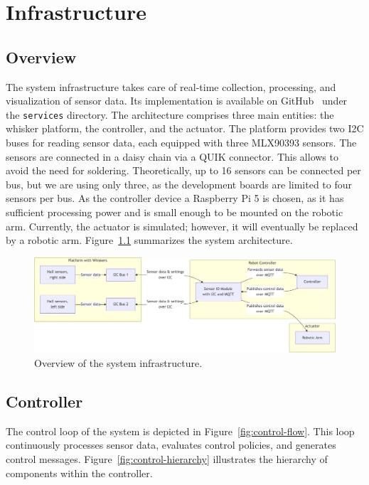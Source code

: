 

\chapter{Infrastructure}


\section{Overview}
The system infrastructure takes care of real-time collection, processing, and visualization of sensor data.
Its implementation is available on GitHub~\cite{ratte-github} under the \texttt{services} directory.
The architecture comprises three main entities: the whisker platform, the controller, and the actuator.
The platform provides two I2C buses for reading sensor data, each equipped with three MLX90393 sensors.
The sensors are connected in a daisy chain via a QUIK connector.
This allows to avoid the need for soldering.
Theoretically, up to 16 sensors can be connected per bus, but we are using only three, as the development boards are limited to four sensors per bus.
As the controller device a Raspberry Pi 5 is chosen, as it has sufficient processing power and is small enough to be mounted on the robotic arm.
Currently, the actuator is simulated; however, it will eventually be replaced by a robotic arm.
Figure~\ref{fig:infrastructure_overview} summarizes the system architecture.

\begin{figure}[htb]
    \centering
    \includegraphics[width=\textwidth]{figures/diagrams/infrastructure-overview}
    \caption{Overview of the system infrastructure.}
    \label{fig:infrastructure_overview}
\end{figure}


\section{Controller}
The control loop of the system is depicted in Figure~\ref{fig:control-flow}.
This loop continuously processes sensor data, evaluates control policies, and generates control messages.
Figure~\ref{fig:control-hierarchy} illustrates the hierarchy of components within the controller.

